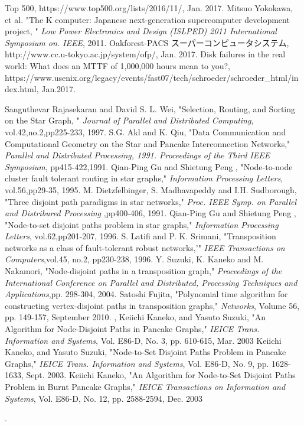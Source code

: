 \documentclass[11pt,a4j]{jsarticle}
\theoremstyle{plain}
\begin{document}
\begin{thebibliography}{9}
Top 500, https://www.top500.org/lists/2016/11/, Jan. 2017.
Mitsuo Yokokawa, et al. "The K computer: Japanese next-generation supercomputer development project, " {\it Low Power Electronics and Design (ISLPED) 2011 International Symposium on. IEEE}, 2011.
Oakforest-PACS スーパーコンピュータシステム, http://www.cc.u-tokyo.ac.jp/system/ofp/, Jan. 2017.
Disk failures in the real world: What does an MTTF of 1,000,000 hours mean to you?, https://www.usenix.org/legacy/events/fast07/tech/schroeder/schroeder\_html/index.html, Jan.2017.


 Sanguthevar Rajasekaran and David S. L. Wei, "Selection, Routing, and Sorting on the Star Graph,	"  {\it Journal of Parallel and Distributed Computing}, {vol.42},{no.2},pp225-233, 1997.
S.G. Akl and K. Qiu, "Data Communication and Computational Geometry on the Star and Pancake Interconnection Networks," {\it Parallel and Distributed Processing, 1991. Proceedings of the Third IEEE Symposium}, pp415-422,1991.
 Qian-Ping Gu and Shietung Peng , "Node-to-node cluster fault tolerant routing in star graphs," {\it Information Processing Letters}, {vol.56},pp29-35, 1995.
 M. Dietzfelbinger, S. Madhavapeddy and I.H. Sudborough, "Three disjoint path paradigms in star networks,"  {\it Proc. IEEE Symp. on Parallel and Distribured Processing} ,pp400-406, 1991.
 Qian-Ping Gu and Shietung Peng , "Node-to-set disjoint paths problem in star graphs,"  {\it Information Processing Letters}, {vol.62},pp201-207, 1996.
S. Latifi and P. K. Srimani, "Transposition networks as a class of fault-tolerant robust networks,'" {\it IEEE Transactions on Computers},{vol.45, no.2}, pp230-238, 1996.
Y. Suzuki, K. Kaneko and M. Nakamori, "Node-disjoint paths in a transposition graph," {\it Proceedings of the International Conference on Parallel and Distributed, Processing Techniques and Applications},pp. 298-304,  2004. 
Satoshi Fujita, "Polynomial time algorithm for constructing vertex-disjoint paths in transposition graphs," {\it Networks}, Volume 56,  pp. 149-157, September 2010. 
 , Keiichi Kaneko, and Yasuto Suzuki, "An Algorithm for Node-Disjoint Paths in Pancake Graphs," {\it IEICE Trans. Information and Systems}, Vol. E86-D, No. 3, pp. 610-615, Mar. 2003
 Keiichi Kaneko, and Yasuto Suzuki, "Node-to-Set Disjoint Paths Problem in Pancake Graphs," {\it IEICE Trans. Information and Systems}, Vol. E86-D, No. 9, pp. 1628-1633, Sept. 2003.
Keiichi Kaneko, "An Algorithm for Node-to-Set Disjoint Paths Problem in Burnt Pancake Graphs," {\it IEICE Transactions on Information and Systems}, Vol. E86-D, No. 12, pp. 2588-2594, Dec. 2003


\end{thebibliography}






.
\end{document}

